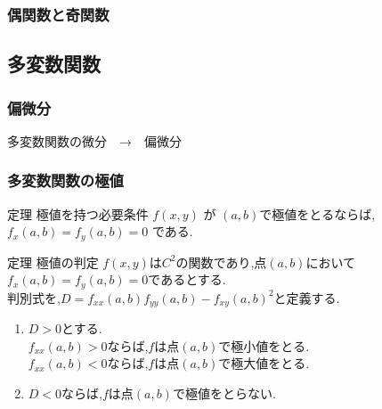 \documentclass[a4paper]{jsarticle}
\begin{document}
\subsubsection{偶関数と奇関数}

\subsection{多変数関数}
\subsubsection{偏微分}
多変数関数の微分　→　偏微分
\subsubsection{多変数関数の極値}
\begin{itembox}[l]{定理 極値を持つ必要条件}
    $f\left(x,y\right)$ が $\left(a,b\right)$で極値をとるならば,
    $f_x\left(a,b\right)=f_y\left(a,b\right)=0$ である.
\end{itembox}
\begin{itembox}[l]{定理 極値の判定}
    $f\left(x,y\right)$は$C^2$の関数であり,点$\left(a,b\right)$において
    $f_x\left(a,b\right)=f_y\left(a, b\right)=0$であるとする.\\
    判別式を,$D=f_{xx}\left(a,b\right)f_{yy}\left(a,b\right)-{f_{xy}(a,b)}^2$と定義する.
    \begin{enumerate}[(1)]
        \item $D>0$とする.\\
              $f_{xx}\left(a,b\right)>0$ならば,$f$は点$\left(a,b\right)$で極小値をとる.\\
              $f_{xx}\left(a,b\right)<0$ならば,$f$は点$\left(a,b\right)$で極大値をとる.
        \item $D<0$ならば,$f$は点$\left(a,b\right)$で極値をとらない.
    \end{enumerate}
\end{itembox}
\end{document}
